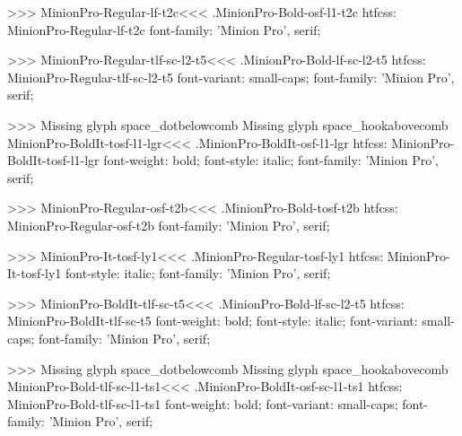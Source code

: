 {>>>
\<MinionPro-Regular-lf-t2c\><<<
.MinionPro-Bold-osf-l1-t2c
htfcss:  MinionPro-Regular-lf-t2c  font-family: 'Minion Pro', serif;

>>>
\<MinionPro-Regular-tlf-sc-l2-t5\><<<
.MinionPro-Bold-lf-sc-l2-t5
htfcss:  MinionPro-Regular-tlf-sc-l2-t5  font-variant: small-caps; font-family: 'Minion Pro', serif;

>>>
Missing glyph	space_dotbelowcomb
Missing glyph	space_hookabovecomb
\<MinionPro-BoldIt-tosf-l1-lgr\><<<
.MinionPro-BoldIt-osf-l1-lgr
htfcss:  MinionPro-BoldIt-tosf-l1-lgr  font-weight: bold; font-style: italic; font-family: 'Minion Pro', serif;

>>>
\<MinionPro-Regular-osf-t2b\><<<
.MinionPro-Bold-tosf-t2b
htfcss:  MinionPro-Regular-osf-t2b  font-family: 'Minion Pro', serif;

>>>
\<MinionPro-It-tosf-ly1\><<<
.MinionPro-Regular-tosf-ly1
htfcss:  MinionPro-It-tosf-ly1  font-style: italic; font-family: 'Minion Pro', serif;

>>>
\<MinionPro-BoldIt-tlf-sc-t5\><<<
.MinionPro-Bold-lf-sc-l2-t5
htfcss:  MinionPro-BoldIt-tlf-sc-t5  font-weight: bold; font-style: italic; font-variant: small-caps; font-family: 'Minion Pro', serif;

>>>
Missing glyph	space_dotbelowcomb
Missing glyph	space_hookabovecomb
\<MinionPro-Bold-tlf-sc-l1-ts1\><<<
.MinionPro-BoldIt-osf-sc-l1-ts1
htfcss:  MinionPro-Bold-tlf-sc-l1-ts1  font-weight: bold; font-variant: small-caps; font-family: 'Minion Pro', serif;

}
